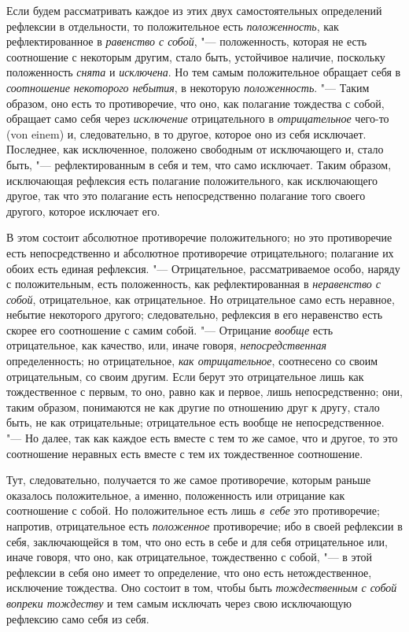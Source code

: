 Если будем рассматривать каждое из этих двух самостоятельных определений
рефлексии в отдельности, то положительное есть
{\em положенность}, как рефлектированное в
{\em равенство с собой}, "--- положенность, которая не
есть соотношение с некоторым другим, стало быть, устойчивое наличие,
поскольку положенность {\em снята} и
{\em исключена}. Но тем самым положительное обращает
себя в {\em соотношение некоторого небытия}, в
некоторую {\em положенность}. "--- Таким образом, оно есть
то противоречие, что оно, как полагание тождества с собой, обращает само
себя через {\em исключение} отрицательного в
{\em отрицательное} чего-то (von einem) и,
следовательно, в то другое, которое оно из себя исключает. Последнее, как
исключенное, положено свободным от исключающего и, стало быть, "---
рефлектированным в себя и тем, что само исключает. Таким образом,
исключающая рефлексия есть полагание положительного, как исключающего
другое, так что это полагание есть непосредственно полагание того своего
другого, которое исключает его.

В этом состоит абсолютное противоречие положительного; но это противоречие
есть непосредственно и абсолютное противоречие отрицательного; полагание их
обоих есть единая рефлексия. "--- Отрицательное, рассматриваемое особо, наряду
с положительным, есть положенность, как рефлектированная в
{\em неравенство с собой}, отрицательное, как
отрицательное. Но отрицательное само есть неравное, небытие некоторого
другого; следовательно, рефлексия в его неравенство есть скорее его
соотношение с самим собой. "--- Отрицание {\em вообще}
есть отрицательное, как качество, или, иначе говоря,
{\em непосредственная} определенность; но
отрицательное, {\em как отрицательное}, соотнесено со
своим отрицательным, со своим другим. Если берут это отрицательное лишь как
тождественное с первым, то оно, равно как и первое, лишь непосредственно;
они, таким образом, понимаются не как другие по отношению друг к другу,
стало быть, не как отрицательные; отрицательное есть вообще не
непосредственное. "--- Но далее, так как каждое есть вместе с тем то же самое,
что и другое, то это соотношение неравных есть вместе с тем их
тождественное соотношение.

Тут, следовательно, получается то же самое противоречие, которым раньше
оказалось положительное, а именно, положенность или отрицание как
соотношение с собой. Но положительное есть лишь {\em в~себе} это
противоречие; напротив, отрицательное есть
{\em положенное} противоречие; ибо в своей рефлексии в
себя, заключающейся в том, что оно есть в себе и для себя отрицательное
или, иначе говоря, что оно, как отрицательное, тождественно
с собой, "--- в этой рефлексии в себя оно имеет то определение, что оно есть
нетождественное, исключение тождества. Оно состоит в том, чтобы быть
{\em тождественным с собой вопреки тождеству} и тем
самым исключать через свою исключающую рефлексию само себя из себя.

